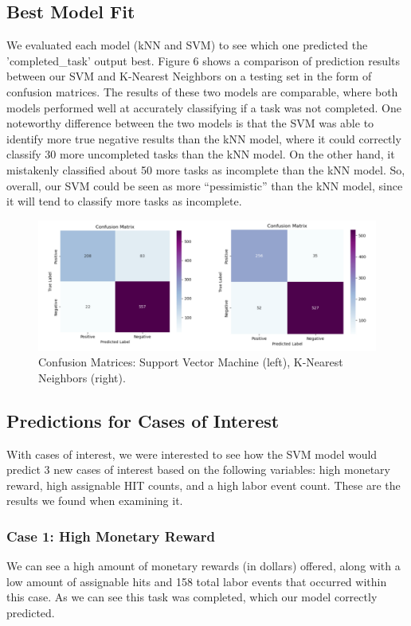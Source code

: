 \documentclass[11pt]{article}
\begin{document}
\subsection{Best Model Fit}
We evaluated each model (kNN and SVM) to see which one predicted the 'completed\_task' output best. Figure 6 shows a comparison of prediction results between our SVM and K-Nearest Neighbors on a testing set in the form of confusion matrices. The results of these two models are comparable, where both models performed well at accurately classifying if a task was not completed. One noteworthy difference between the two models is that the SVM was able to identify more true negative results than the kNN model, where it could correctly classify 30 more uncompleted tasks than the kNN model. On the other hand, it mistakenly classified about 50 more tasks as incomplete than the kNN model. So, overall, our SVM could be seen as more “pessimistic” than the kNN model, since it will tend to classify more tasks as incomplete.

\begin{figure}[hbt!]
  \centering
  \includegraphics[width=\linewidth]{figures/confusion-matrices-svm-knn}
  \caption{Confusion Matrices: Support Vector Machine (left), K-Nearest Neighbors (right).}
\end{figure}

\pagebreak

\subsection{Predictions for Cases of Interest}
With cases of interest, we were interested to see how the SVM model would predict 3 new cases of interest based on the following variables: high monetary reward, high assignable HIT counts, and a high labor event count. These are the results we found when examining it.

\subsubsection{Case 1: High Monetary Reward}
We can see a high amount of monetary rewards (in dollars) offered, along with a low amount of assignable hits and 158 total labor events that occurred within this case. As we can see this task was completed, which our model correctly predicted.
\end{document}
